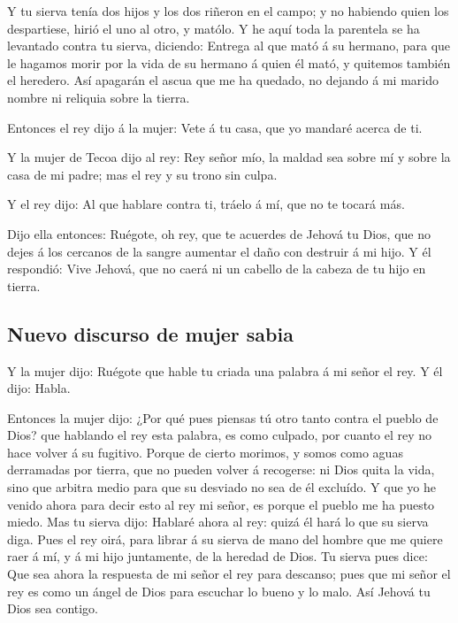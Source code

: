  Y tu sierva tenía dos hijos y los dos riñeron en el
campo; y no habiendo quien los despartiese, hirió el uno al otro, y
matólo.  Y he aquí toda la parentela se ha levantado
contra tu sierva, diciendo: Entrega al que mató á su hermano, para que
le hagamos morir por la vida de su hermano á quien él mató, y quitemos
también el heredero. Así apagarán el ascua que me ha quedado, no dejando
á mi marido nombre ni reliquia sobre la tierra.

 Entonces el rey dijo á la mujer: Vete á tu casa, que yo
mandaré acerca de ti.

 Y la mujer de Tecoa dijo al rey: Rey señor mío, la maldad
sea sobre mí y sobre la casa de mi padre; mas el rey y su trono sin
culpa.

 Y el rey dijo: Al que hablare contra ti, tráelo á mí,
que no te tocará más.

 Dijo ella entonces: Ruégote, oh rey, que te acuerdes de
Jehová tu Dios, que no dejes á los cercanos de la sangre aumentar el
daño con destruir á mi hijo. Y él respondió: Vive Jehová, que no caerá
ni un cabello de la cabeza de tu hijo en tierra.

\hypertarget{nuevo-discurso-de-mujer-sabia}{%
\subsection{Nuevo discurso de mujer
sabia}\label{nuevo-discurso-de-mujer-sabia}}

 Y la mujer dijo: Ruégote que hable tu criada una palabra
á mi señor el rey. Y él dijo: Habla.

 Entonces la mujer dijo: ¿Por qué pues piensas tú otro
tanto contra el pueblo de Dios? que hablando el rey esta palabra, es
como culpado, por cuanto el rey no hace volver á su fugitivo.
 Porque de cierto morimos, y somos como aguas derramadas
por tierra, que no pueden volver á recogerse: ni Dios quita la vida,
sino que arbitra medio para que su desviado no sea de él excluído.
 Y que yo he venido ahora para decir esto al rey mi
señor, es porque el pueblo me ha puesto miedo. Mas tu sierva dijo:
Hablaré ahora al rey: quizá él hará lo que su sierva diga.
 Pues el rey oirá, para librar á su sierva de mano del
hombre que me quiere raer á mí, y á mi hijo juntamente, de la heredad de
Dios.  Tu sierva pues dice: Que sea ahora la respuesta de
mi señor el rey para descanso; pues que mi señor el rey es como un ángel
de Dios para escuchar lo bueno y lo malo. Así Jehová tu Dios sea
contigo.

